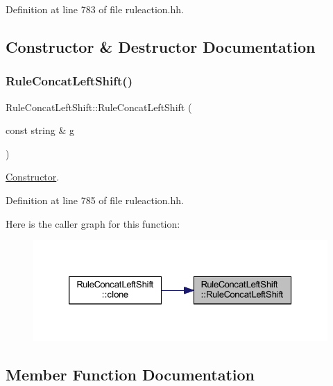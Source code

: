 Definition at line 783 of file ruleaction.\+hh.



\subsection{Constructor \& Destructor Documentation}
\mbox{\label{class_rule_concat_left_shift_a234535865c59f7fb38a8ed8200821d27}} 
\subsubsection{\texorpdfstring{RuleConcatLeftShift()}{RuleConcatLeftShift()}}
{\footnotesize\ttfamily Rule\+Concat\+Left\+Shift\+::\+Rule\+Concat\+Left\+Shift (\begin{DoxyParamCaption}\item[{const string \&}]{g }\end{DoxyParamCaption})\hspace{0.3cm}{\ttfamily [inline]}}



\mbox{\hyperlink{class_constructor}{Constructor}}. 



Definition at line 785 of file ruleaction.\+hh.

Here is the caller graph for this function\+:
\nopagebreak
\begin{figure}[H]
\begin{center}
\leavevmode
\includegraphics[width=326pt]{class_rule_concat_left_shift_a234535865c59f7fb38a8ed8200821d27_icgraph}
\end{center}
\end{figure}


\subsection{Member Function Documentation}
\mbox{\label{class_rule_concat_left_shift_aca7e943a778d99122e5d3c18f5d77f8f}} 
